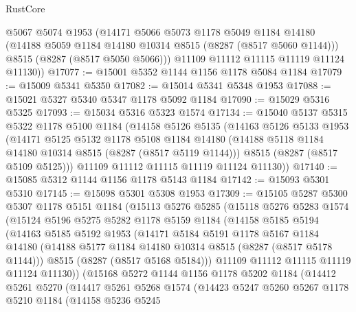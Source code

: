 \begin{lexlean}{RustCore}
\begin{coremodule}
        @5067
        @5074
        @1953
        (@14171
          @5066
          @5073
          @1178
          @5049
          @1184
          @14180
          (@14188 @5059 @1184 @14180 @10314 @8515 (@8287 (@8517 @5060 @1144)))
          @8515
          (@8287 (@8517 @5050 @5066)))
        @11109
        @11112
        @11115
        @11119
        @11124
        @11130))
@17077 := @15001 @5352 @1144 @1156 @1178 @5084 @1184
@17079 := @15009 @5341 @5350
@17082 := @15014 @5341 @5348 @1953
@17088 := @15021 @5327 @5340 @5347 @1178 @5092 @1184
@17090 := @15029 @5316 @5325
@17093 := @15034 @5316 @5323 @1574
@17134 := @15040
    @5137
    @5315
    @5322
    @1178
    @5100
    @1184
    (@14158
      @5126
      @5135
      (@14163
        @5126
        @5133
        @1953
        (@14171
          @5125
          @5132
          @1178
          @5108
          @1184
          @14180
          (@14188 @5118 @1184 @14180 @10314 @8515 (@8287 (@8517 @5119 @1144)))
          @8515
          (@8287 (@8517 @5109 @5125)))
        @11109
        @11112
        @11115
        @11119
        @11124
        @11130))
@17140 := @15085 @5312 @1144 @1156 @1178 @5143 @1184
@17142 := @15093 @5301 @5310
@17145 := @15098 @5301 @5308 @1953
@17309 := @15105
    @5287
    @5300
    @5307
    @1178
    @5151
    @1184
    (@15113
      @5276
      @5285
      (@15118
        @5276
        @5283
        @1574
        (@15124
          @5196
          @5275
          @5282
          @1178
          @5159
          @1184
          (@14158
            @5185
            @5194
            (@14163
              @5185
              @5192
              @1953
              (@14171
                @5184
                @5191
                @1178
                @5167
                @1184
                @14180
                (@14188 @5177 @1184 @14180 @10314 @8515 (@8287 (@8517 @5178 @1144)))
                @8515
                (@8287 (@8517 @5168 @5184)))
              @11109
              @11112
              @11115
              @11119
              @11124
              @11130))
          (@15168
            @5272
            @1144
            @1156
            @1178
            @5202
            @1184
            (@14412
              @5261
              @5270
              (@14417
                @5261
                @5268
                @1574
                (@14423
                  @5247
                  @5260
                  @5267
                  @1178
                  @5210
                  @1184
                  (@14158
                    @5236
                    @5245

\end{coremodule}
\end{lexlean}
